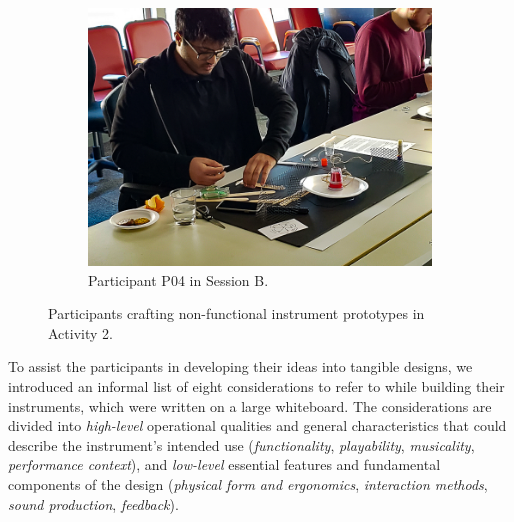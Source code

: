 \documentclass[letterpaper, 12pt]{article}
\begin{document}
\begin{figure}[t]
\begin{subfigure}[]{0.4\textwidth}
        \includegraphics[width=1\textwidth]{ch3_dfp_nfp_B_P4.jpg}
        \caption{Participant P04 in Session B.}
    \end{subfigure}
    \caption[Design for Performance workshop: Activity 2 - Non-functional prototyping]{Participants crafting non-functional instrument prototypes in Activity 2.}
    \label{ch3-fig:instrument-building}
\end{figure}



To assist the participants in developing their ideas into tangible designs, we introduced an informal list of eight considerations to refer to while building their instruments, which were written on a large whiteboard. The considerations are divided into \emph{high-level} operational qualities and general characteristics that could describe the instrument's intended use (\emph{functionality}, \emph{playability}, \emph{musicality}, \emph{performance context}), and \emph{low-level} essential features and fundamental components of the design (\emph{physical form and ergonomics}, \emph{interaction methods}, \emph{sound production}, \emph{feedback}).
\end{document}
